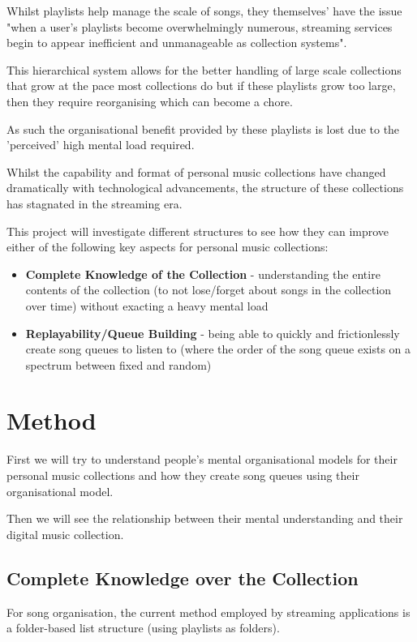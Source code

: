 Whilst playlists help manage the scale of songs, they themselves' have the issue "when a user’s playlists become overwhelmingly numerous, streaming services begin to appear inefficient and unmanageable as collection systems"\cite{playlistExperience}.

This hierarchical system allows for the better handling of large scale collections that grow at the pace most collections do \cite{} but if these playlists grow too large, then they require reorganising which can become a chore.

As such the organisational benefit provided by these playlists is lost due to the 'perceived' high mental load required.

Whilst the capability and format of personal music collections have changed dramatically with technological advancements, the structure of these collections has stagnated in the streaming era.

This project will investigate different structures to see how they can improve either of the following key aspects for personal music collections:\begin{itemize}
    \item \textbf{
        Complete Knowledge of the Collection
    } - understanding the entire contents of the collection (to not lose/forget about songs in the collection over time) without exacting a heavy mental load
    \item \textbf{
        Replayability/Queue Building
    } - being able to quickly and frictionlessly create song queues to listen to (where the order of the song queue exists on a spectrum between fixed and random)
\end{itemize}

\section{Method}
First we will try to understand people's mental organisational models for their personal music collections and how they create song queues using their organisational model.

Then we will see the relationship between their mental understanding and their digital music collection.

\subsection{Complete Knowledge over the Collection}
For song organisation, the current method employed by streaming applications is a folder-based list structure (using playlists as folders).

